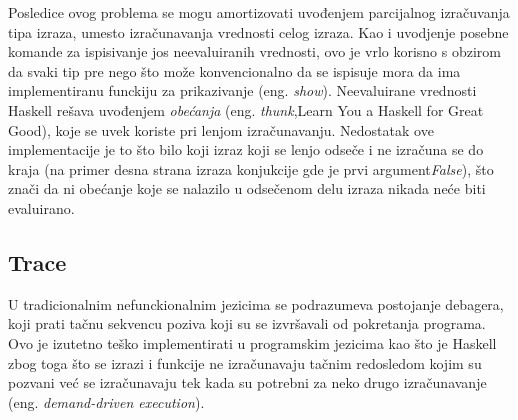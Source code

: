 \documentclass[a4paper]{article}
\begin{document}
Posledice ovog problema se mogu amortizovati uvođenjem parcijalnog izračuvanja tipa izraza, umesto izračunavanja vrednosti celog izraza. Kao i uvodjenje posebne komande za ispisivanje jos neevaluiranih vrednosti, ovo je vrlo korisno s obzirom da svaki tip pre nego što može konvencionalno da se ispisuje mora da ima implementiranu funckiju za prikazivanje (eng. {\em show}). Neevaluirane vrednosti Haskell rešava uvođenjem {\em obećanja} (eng. {\em thunk},Learn You a Haskell for Great Good), koje se uvek koriste pri lenjom izračunavanju. Nedostatak ove implementacije je to što bilo koji izraz koji se lenjo odseče i ne izračuna se do kraja (na primer desna strana izraza konjukcije gde je prvi argument{\em False}), što znači da ni obećanje koje se nalazilo u odsečenom delu izraza nikada neće biti evaluirano. 


\subsection{Trace}

U tradicionalnim nefunckionalnim jezicima se podrazumeva postojanje debagera, koji prati tačnu sekvencu poziva koji su se izvršavali od pokretanja programa. Ovo je izutetno teško implementirati u programskim jezicima kao što je Haskell zbog toga što se izrazi i funkcije ne izračunavaju tačnim redosledom kojim su pozvani već se izračunavaju tek kada su potrebni za neko drugo izračunavanje (eng. {\em demand-driven execution}).
\end{document}
